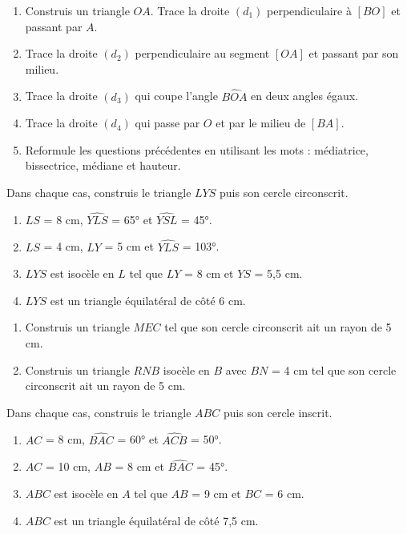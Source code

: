 \begin{exercice}[Vocabulaire] 
\begin{enumerate}
\item Construis un triangle $OA$. Trace la droite $(d_1)$ perpendiculaire à $[BO]$ et passant par $A$.
\item Trace la droite $(d_2)$ perpendiculaire au segment $[OA]$ et passant par son milieu.
\item Trace la droite $(d_3)$ qui coupe l'angle $\widehat{BOA}$ en deux angles égaux.
\item Trace la droite $(d_4)$ qui passe par $O$ et par le milieu de $[BA]$.
\item Reformule les questions précédentes en utilisant les mots : médiatrice, bissectrice, médiane et hauteur.
\end{enumerate}
\end{exercice}



\begin{exercice}
Dans chaque cas, construis le triangle $LYS$ puis son cercle circonscrit.
\begin{enumerate}
\item $LS$ = 8 cm, $\widehat{YLS}$ = 65° et $\widehat{YSL}$ = 45°.
\item $LS$ = 4 cm, $LY$ = 5 cm et $\widehat{YLS}$ = 103°.
\item $LYS$ est isocèle en $L$ tel que $LY$ = 8 cm et $YS$ = 5,5 cm.
\item $LYS$ est un triangle équilatéral de côté 6 cm.
\end{enumerate}
\end{exercice}




\begin{exercice}
\begin{enumerate}
\item Construis un triangle $MEC$ tel que son cercle circonscrit ait un rayon de 5 cm.
\item Construis un triangle $RNB$ isocèle en $B$ avec $BN$ = 4 cm tel que son cercle circonscrit ait un rayon de 5 cm.
\end{enumerate}
\end{exercice}



\begin{exercice}
Dans chaque cas, construis le triangle $ABC$ puis son cercle inscrit.
\begin{enumerate}
\item $AC$ = 8 cm, $\widehat{BAC}$ = 60° et $\widehat{ACB}$ = 50°.
\item $AC$ = 10 cm, $AB$ = 8 cm et $\widehat{BAC}$ = 45°.
\item $ABC$ est isocèle en $A$ tel que $AB$ = 9 cm et $BC$ = 6 cm.
\item $ABC$ est un triangle équilatéral de côté 7,5 cm.
\end{enumerate}
\end{exercice}



